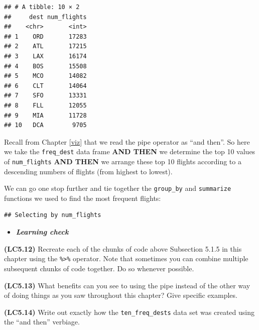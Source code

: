 \documentclass[]{tufte-book}
\newenvironment{Shaded}{\begin{snugshade}}{\end{snugshade}}
\newcommand{\KeywordTok}[1]{\textcolor[rgb]{0.13,0.29,0.53}{\textbf{{#1}}}}
\newcommand{\DataTypeTok}[1]{\textcolor[rgb]{0.13,0.29,0.53}{{#1}}}
\newcommand{\DecValTok}[1]{\textcolor[rgb]{0.00,0.00,0.81}{{#1}}}
\newcommand{\StringTok}[1]{\textcolor[rgb]{0.31,0.60,0.02}{{#1}}}
\newcommand{\NormalTok}[1]{{#1}}
\newenvironment{rmdblock}[1]
  {\begin{shaded*}
  \begin{itemize}
  \renewcommand{\labelitemi}{
    \raisebox{-.7\height}[0pt][0pt]{
    }
  }
  \item
  }
  {
  \end{itemize}
  \end{shaded*}
  }
\newenvironment{learncheck}
  {\begin{rmdblock}{warning}}
  {\end{rmdblock}}
\begin{document}
\begin{verbatim}
## # A tibble: 10 × 2
##     dest num_flights
##    <chr>       <int>
## 1    ORD       17283
## 2    ATL       17215
## 3    LAX       16174
## 4    BOS       15508
## 5    MCO       14082
## 6    CLT       14064
## 7    SFO       13331
## 8    FLL       12055
## 9    MIA       11728
## 10   DCA        9705
\end{verbatim}

Recall from Chapter \ref{viz} that we read the pipe operator as ``and
then''. So here we take the \texttt{freq\_dest} data frame \textbf{AND
THEN} we determine the top 10 values of \texttt{num\_flights}
\textbf{AND THEN} we arrange these top 10 flights according to a
descending numbers of flights (from highest to lowest).

We can go one stop further and tie together the \texttt{group\_by} and
\texttt{summarize} functions we used to find the most frequent flights:

\begin{Shaded}
\end{Shaded}

\begin{verbatim}
## Selecting by num_flights
\end{verbatim}

\begin{learncheck}
\textbf{\emph{Learning check}}
\end{learncheck}

\textbf{(LC5.12)} Recreate each of the chunks of code above Subsection
5.1.5 in this chapter using the \texttt{\%\textgreater{}\%} operator.
Note that sometimes you can combine multiple subsequent chunks of code
together. Do so whenever possible.

\textbf{(LC5.13)} What benefits can you see to using the pipe instead of
the other way of doing things as you saw throughout this chapter? Give
specific examples.

\textbf{(LC5.14)} Write out exactly how the \texttt{ten\_freq\_dests}
data set was created using the ``and then'' verbiage.
\end{document}
